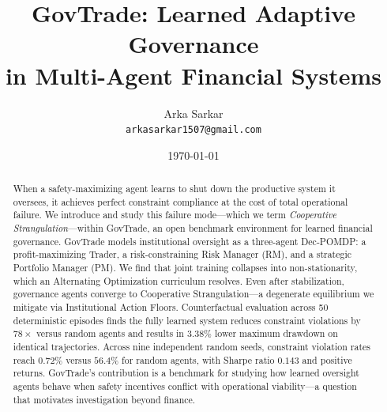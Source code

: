 \documentclass[11pt]{article}
\title{%
  \textbf{GovTrade: Learned Adaptive Governance \\
  in Multi-Agent Financial Systems}
}
\author{
  Arka Sarkar \\
  \texttt{arkasarkar1507@gmail.com}
}
\date{\today}
\begin{document}
\maketitle

\begin{abstract}
When a safety-maximizing agent learns to shut down the productive system it oversees, it achieves perfect constraint compliance at the cost of total operational failure. We introduce and study this failure mode---which we term \emph{Cooperative Strangulation}---within GovTrade, an open benchmark environment for learned financial governance. GovTrade models institutional oversight as a three-agent Dec-POMDP: a profit-maximizing Trader, a risk-constraining Risk Manager (RM), and a strategic Portfolio Manager (PM). We find that joint training collapses into non-stationarity, which an Alternating Optimization curriculum resolves. Even after stabilization, governance agents converge to Cooperative Strangulation---a degenerate equilibrium we mitigate via Institutional Action Floors. Counterfactual evaluation across 50 deterministic episodes finds the fully learned system reduces constraint violations by $78\times$ versus random agents and results in $3.38\%$ lower maximum drawdown on identical trajectories. Across nine independent random seeds, constraint violation rates reach $0.72\%$ versus $56.4\%$ for random agents, with Sharpe ratio $0.143$ and positive returns. GovTrade's contribution is a benchmark for studying how learned oversight agents behave when safety incentives conflict with operational viability---a question that motivates investigation beyond finance.
\end{abstract}

\end{document}
